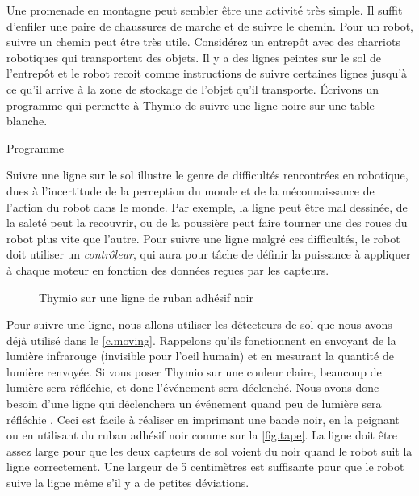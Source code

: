 \label{ch.line}

Une promenade en montagne peut sembler être une activité très simple.
Il suffit d'enfiler une paire de chaussures de marche et de suivre le chemin.
Pour un robot, suivre un chemin peut être très utile.
Considérez un entrepôt avec des charriots robotiques qui transportent des objets.
Il y a des lignes peintes sur le sol de l'entrepôt et le robot recoit comme instructions de suivre certaines lignes jusqu'à ce qu'il arrive à la zone de stockage de l'objet qu'il transporte.
Écrivons un programme qui permette à Thymio de suivre une ligne noire sur une table blanche.

{\raggedleft \hfill Programme }

Suivre une ligne sur le sol illustre le genre de difficultés rencontrées en robotique, dues à l'incertitude de la perception du monde et de la méconnaissance de l'action du robot dans le monde.
Par exemple, la ligne peut être mal dessinée, de la saleté peut la recouvrir, ou de la poussière peut faire tourner une des roues du robot plus vite que l'autre.
Pour suivre une ligne malgré ces difficultés, le robot doit utiliser un \emph{contrôleur}, qui aura pour tâche de définir la puissance à appliquer à chaque moteur en fonction des données reçues par les capteurs.


\begin{figure}
	\hfill
	\caption{Thymio sur une ligne de ruban adhésif noir}
\end{figure}


Pour suivre une ligne, nous allons utiliser les détecteurs de sol que nous avons déjà utilisé dans le \cref{c.moving}.
Rappelons qu'ils fonctionnent en envoyant de la lumière infrarouge (invisible pour l'oeil humain) et en mesurant la quantité de lumière renvoyée.
Si vous poser Thymio sur une couleur claire, beaucoup de lumière sera réfléchie, et donc l'événement  sera déclenché.
Nous avons donc besoin d'une ligne qui déclenchera un événement quand peu de lumière sera réfléchie .
Ceci est facile à réaliser en imprimant une bande noir, en la peignant ou en utilisant du ruban adhésif noir comme sur la \cref{fig.tape}.
La ligne doit être assez large pour que les deux capteurs de sol voient du noir quand le robot suit la ligne correctement.
Une largeur de 5 centimètres est suffisante pour que le robot suive la ligne même s'il y a de petites déviations.

